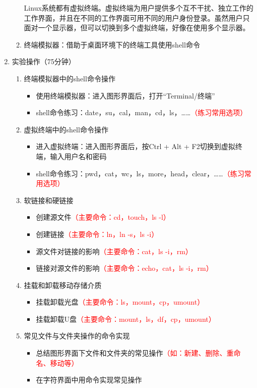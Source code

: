 \documentclass{TIJMUjiaoanSY}
\begin{document}
\begin{enumerate}
\begin{enumerate}
	Linux系统都有虚拟终端。虚拟终端为用户提供多个互不干扰、独立工作的工作界面，并且在不同的工作界面可用不同的用户身份登录。虽然用户只面对一个显示器，但可以切换到多个虚拟终端，好像在使用多个显示器。
      \item 终端模拟器：借助于桌面环境下的终端工具使用shell命令
    \end{enumerate}
  \item 实验操作（75分钟）
    \begin{enumerate}
      \item 终端模拟器中的shell命令操作
	\begin{itemize}
	  \item 使用终端模拟器：进入图形界面后，打开“Terminal/终端”
	  \item shell命令练习：date，su，cal，man，cd，ls，……\textcolor{red}{（练习常用选项）}
	\end{itemize}
      \item 虚拟终端中的shell命令操作
	\begin{itemize}
	  \item 进入虚拟终端：进入图形界面后，按Ctrl + Alt + F2切换到虚拟终端，输入用户名和密码
	  \item shell命令练习：pwd，cat，wc，ls，more，head，clear，……\textcolor{red}{（练习常用选项）}
	\end{itemize}
      \item 软链接和硬链接
	\begin{itemize}
	  \item 创建源文件\textcolor{red}{（主要命令：cd，touch，ls -l）}
	  \item 创建链接\textcolor{red}{（主要命令：ln，ln -s，ls -i）}
	  \item 源文件对链接的影响\textcolor{red}{（主要命令：cat，ls -i，rm）}
	  \item 链接对源文件的影响\textcolor{red}{（主要命令：echo，cat，ls -i，rm）}
	\end{itemize}
      \item 挂载和卸载移动存储介质
	\begin{itemize}
	  \item 挂载卸载光盘\textcolor{red}{（主要命令：ls，mount，cp，umount）}
	  \item 挂载卸载U盘\textcolor{red}{（主要命令：mount，ls，df，cp，umount）}
	\end{itemize}
      \item 常见文件与文件夹操作的命令实现
	\begin{itemize}
	  \item 总结图形界面下文件和文件夹的常见操作\textcolor{red}{（如：新建、删除、重命名、移动等）}
	  \item 在字符界面中用命令实现常见操作
	\end{itemize}
    \end{enumerate}
\end{enumerate}


\otherTail
\end{document}
